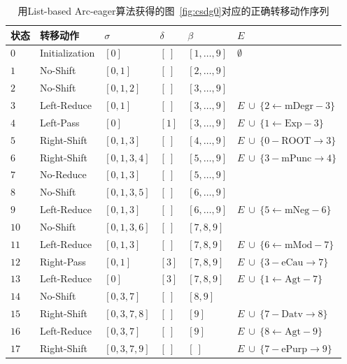 \begin{table}[thbp]
	\centering
	\small
	\renewcommand{\arraystretch}{1.2}
	\begin{tabular}{C{3em}L{7em}R{4em}C{4em}L{4em}L{9em}}
		\hline
		\bf 状态 & \bf 转移动作 & $\sigma$ & $\delta$ & $\beta$ & $E$ \\
		\hline
		$0$ & Initialization & $[0]$ & $[\ ]$ & $[1, \dots, 9]$ & $\emptyset $ \\
		$1$ & No-Shift & $[0, 1]$ & $[\ ]$ & $[2, \dots, 9]$ &  \\
		$2$ & No-Shift & $[0, 1, 2]$ & $[\ ]$ & $[3, \dots, 9]$ &  \\
		$3$ & Left-Reduce & $[0, 1]$ & $[\ ]$ & $[3, \dots, 9]$ & $E\ \cup\ \{2\leftarrow \textrm{mDegr}-3\}$ \\
		$4$ & Left-Pass & $[0]$ & $[1]$ & $[3, \dots, 9]$ & $E\ \cup\ \{1\leftarrow \textrm{Exp}-3\}$ \\
		$5$ & Right-Shift & $[0, 1, 3]$ & $[\ ]$ & $[4, \dots, 9]$ & $E\ \cup\ \{0- \textrm{ROOT}\rightarrow 3\}$ \\
		$6$ & Right-Shift & $[0, 1, 3, 4]$ & $[\ ]$ & $[5, \dots, 9]$ & $E\ \cup\ \{3- \textrm{mPunc}\rightarrow 4\}$ \\
		$7$ & No-Reduce & $[0, 1, 3]$ & $[\ ]$ & $[5, \dots, 9]$ &  \\
		$8$ & No-Shift & $[0, 1, 3, 5]$ & $[\ ]$ & $[6, \dots, 9]$ &  \\
		$9$ & Left-Reduce & $[0, 1, 3]$ & $[\ ]$ & $[6, \dots, 9]$ & $E\ \cup\ \{5\leftarrow \textrm{mNeg}-6\}$ \\
		$10$ & No-Shift & $[0, 1, 3, 6]$ & $[\ ]$ & $[7, 8, 9]$ &  \\
		$11$ & Left-Reduce & $[0, 1, 3]$ & $[\ ]$ & $[7, 8, 9]$ & $E\ \cup\ \{6\leftarrow \textrm{mMod}-7\}$ \\
		$12$ & Right-Pass & $[0, 1]$ & $[3]$ & $[7, 8, 9]$ & $E\ \cup\ \{3- \textrm{eCau}\rightarrow 7\}$ \\
		$13$ & Left-Reduce & $[0]$ & $[3]$ & $[7, 8, 9]$ & $E\ \cup\ \{1\leftarrow \textrm{Agt}-7\}$ \\
		$14$ & No-Shift & $[0, 3, 7]$ & $[\ ]$ & $[8, 9]$ &  \\
		$15$ & Right-Shift & $[0, 3, 7, 8]$ & $[\ ]$ & $[9]$ & $E\ \cup\ \{7- \textrm{Datv}\rightarrow 8\}$ \\
		$16$ & Left-Reduce & $[0, 3, 7]$ & $[\ ]$ & $[9]$ & $E\ \cup\ \{8\leftarrow \textrm{Agt}-9\}$ \\
		$17$ & Right-Shift & $[0, 3, 7, 9]$ & $[\ ]$ & $[\ ]$ & $E\ \cup\ \{7- \textrm{ePurp}\rightarrow 9\}$ \\
		\hline
	\end{tabular}
	\caption{用List-based Arc-eager算法获得的图~\ref{fig:csdg0}对应的正确转移动作序列}
	\label{tbl:trans-seq}
\end{table}

